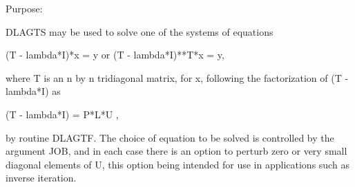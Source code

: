  \begin{DoxyParagraph}{Purpose\+: }
\begin{DoxyVerb} DLAGTS may be used to solve one of the systems of equations

    (T - lambda*I)*x = y   or   (T - lambda*I)**T*x = y,

 where T is an n by n tridiagonal matrix, for x, following the
 factorization of (T - lambda*I) as

    (T - lambda*I) = P*L*U ,

 by routine DLAGTF. The choice of equation to be solved is
 controlled by the argument JOB, and in each case there is an option
 to perturb zero or very small diagonal elements of U, this option
 being intended for use in applications such as inverse iteration.\end{DoxyVerb}
 
\end{DoxyParagraph}

